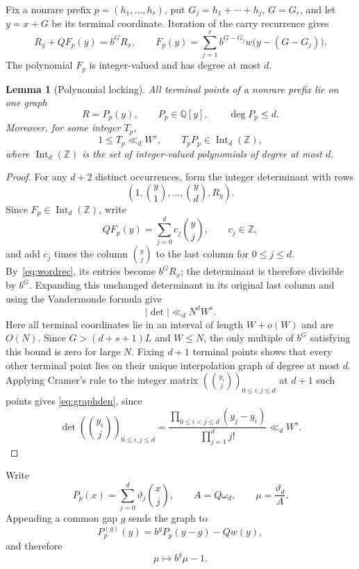 \documentclass[10pt,a4paper]{amsart}
\newtheorem{lemma}[theorem]{Lemma}
\newcommand{\Q}{\mathbb Q}
\newcommand{\Z}{\mathbb Z}
\newcommand{\Int}{\operatorname{Int}}
\begin{document}
Fix a nonrare prefix $p=(h_1,\ldots,h_r)$, put
$G_j=h_1+\cdots+h_j$, $G=G_r$, and let $y=x+G$ be its terminal coordinate.
Iteration of the carry recurrence gives
\begin{equation}\label{eq:wordrec}
 R_y+QF_p(y)=b^GR_x,\qquad
 F_p(y)=\sum_{j=1}^rb^{G-G_j}w\bigl(y-(G-G_j)\bigr).
\end{equation}
The polynomial $F_p$ is integer-valued and has degree at most $d$.

\begin{lemma}[Polynomial locking]\label{lem:locking}
All terminal points of a nonrare prefix lie on one graph
\[
 R=P_p(y),\qquad P_p\in\Q[y],\qquad \deg P_p\le d.
\]
Moreover, for some integer $T_p$,
\begin{equation}\label{eq:graphden}
 1\le T_p\ll_d W^s,\qquad
 T_pP_p\in\Int_d(\Z),
\end{equation}
where $\Int_d(\Z)$ is the set of integer-valued polynomials of degree at
most $d$.
\end{lemma}

\begin{proof}
For any $d+2$ distinct occurrences, form the integer determinant with rows
\[
 \left(1,\binom y1,\ldots,\binom yd,R_y\right).
\]
Since $F_p\in\Int_d(\Z)$, write
\[
 QF_p(y)=\sum_{j=0}^dc_j\binom yj,\qquad c_j\in\Z,
\]
and add $c_j$ times the column $\binom yj$ to the last column for
$0\le j\le d$. By~\eqref{eq:wordrec}, its entries become $b^GR_x$; the
determinant is therefore divisible by $b^G$. Expanding this unchanged
determinant in its original last column and using the Vandermonde formula give
\[
 |\det|\ll_d N^dW^s.
\]
Here all terminal coordinates lie in an interval of length $W+o(W)$ and are
$O(N)$. Since $G>(d+s+1)L$ and $W\le N$, the only multiple of $b^G$ satisfying
this bound is zero for large $N$. Fixing $d+1$ terminal points shows that every
other terminal point lies on their unique interpolation graph of degree at
most $d$. Applying Cramer's rule to the integer matrix
$(\binom{y_i}{j})_{0\le i,j\le d}$ at $d+1$ such points gives
\eqref{eq:graphden}, since
\[
 \det\left(\binom{y_i}{j}\right)_{0\le i,j\le d}
 =\frac{\prod_{0\le i<j\le d}(y_j-y_i)}{\prod_{j=1}^d j!}
 \ll_d W^s.
\]
\end{proof}

Write
\[
 P_p(x)=\sum_{j=0}^d\vartheta_j\binom xj,\qquad
 A=Q\omega_d,\qquad \mu=\frac{\vartheta_d}{A}.
\]
Appending a common gap $g$ sends the graph to
\[
 P_p^{(g)}(y)=b^gP_p(y-g)-Qw(y),
\]
and therefore
\begin{equation}\label{eq:topmap}
 \mu\longmapsto b^g\mu-1.
\end{equation}
\end{document}
